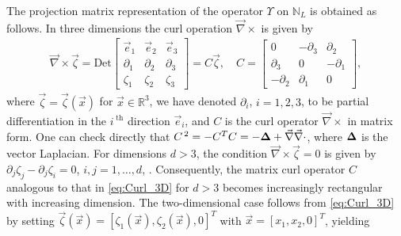 \documentclass{cmslatex}
\newcommand\bDelta{\mbox{\boldmath${\Delta}$}}
\begin{document}
The projection matrix representation of the operator $\Upsilon$ on
$\mathbb{N}_L$ is obtained as follows. In three dimensions the curl
operation $\vec{\nabla}\times$ is given by 
%
\begin{align}\label{eq:Curl_3D}
  \vec{\nabla}\times\vec{\zeta}=
     \text{Det}\left[
  \begin{array}{ccc}
    \vec{e}_1 &\vec{e}_2 &\vec{e}_3\\
       \partial_1    &   \partial_2    &   \partial_3   \\
       \zeta_1    &   \zeta_2    &   \zeta_3   
    \end{array}
    \right]
    =C\vec{\zeta}, \quad
    C=
    \left[
    \begin{array}{ccc}
       0  & -\partial_3  &   \partial_2 \\
       \partial_3 &  0   &  -\partial_1 \\
      -\partial_2 &  \partial_1  &   0
    \end{array}
    \right],    
\end{align}
%
where $\vec{\zeta}=\vec{\zeta}(\vec{x})$ for $\vec{x}\in\mathbb{R}^3$, we
have denoted $\partial_i$, $i=1,2,3$, to be partial differentiation in the
$i^{\;\text{th}}$ direction $\vec{e}_i$, and $C$ is the curl
operator $\vec{\nabla}\times$ in matrix form. One can check directly
that $C^{\,2}=-C^TC=-\bDelta+\vec{\nabla}\vec{\nabla}\cdot$, where $\bDelta$ is the vector
Laplacian. For dimensions $d>3$, the condition $\vec{\nabla}\times\vec{\zeta}=0$ is
given by $\partial_j\zeta_j-\partial_j\zeta_i=0$, $i,j=1,\ldots,d$,
\cite{Golden:CMP-473}. Consequently, the matrix curl operator $C$
analogous to that in \eqref{eq:Curl_3D} for $d>3$ becomes increasingly 
rectangular with increasing dimension. The two-dimensional case 
follows from \eqref{eq:Curl_3D} by setting
$\vec{\zeta}(\vec{x})=[\zeta_1(\vec{x}),\zeta_2(\vec{x}),0]^T$ with
$\vec{x}=[x_1,x_2,0]^T$, yielding   
%
\end{document}
